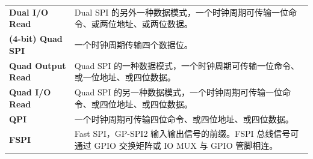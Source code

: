 \begin{longtable}[c]{ R{4cm} p{10cm} }
\textbf{Dual I/O Read} & Dual SPI 的另外一种数据模式，一个时钟周期可传输一位命令、或两位地址、或两位数据。\\
\textbf{(4-bit) Quad SPI} & 一个时钟周期传输四个数据位。\\
\textbf{Quad Output Read} & Quad SPI 的一种数据模式，一个时钟周期可传输一位命令、或一位地址、或四位数据。\\
\textbf{Quad I/O Read} & Quad SPI 的另一种数据模式，一个时钟周期可传输一位命令、或四位地址、或四位数据。\\
\textbf{QPI} & 一个时钟周期可传输四位命令、或四位地址、或四位数据。\\
\textbf{FSPI} & Fast SPI，GP-SPI2 输入输出信号的前缀。FSPI 总线信号可通过 GPIO 交换矩阵或 IO MUX 与 GPIO 管脚相连。\\
\end{longtable}
